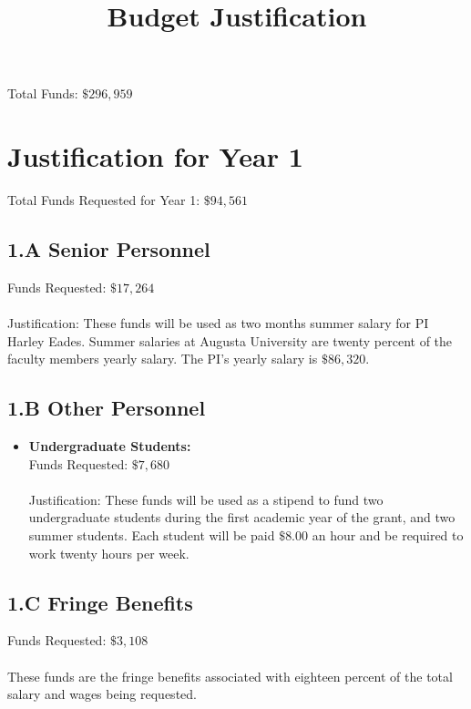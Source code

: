 \documentclass[11pt]{article}
\title{\vspace{-50px}Budget Justification}
\date{\vspace{-60px}}
\begin{document}
\maketitle  

\noindent
Total Funds: $\$296,959$\\
\vspace{-20px}
\section{Justification for Year 1}
\label{sec:year_1}
Total Funds Requested for Year 1: $\$94,561$\\
\vspace{-20px}
\subsection*{1.A Senior Personnel}
\label{subsec:a_senior_personnel}

Funds Requested: $\$17,264$\\
\ \\
Justification: These funds will be used as two months summer salary
for PI Harley Eades.  Summer salaries at Augusta University are twenty
percent of the faculty members yearly salary.  The PI's yearly salary
is $\$86,320$.


\subsection*{1.B Other Personnel}
\label{subsec:personnel}
\begin{itemize}

\item \textbf{Undergraduate Students:}\\ Funds Requested:
  $\$7,680$\\ \ \\ Justification: These funds will be used as a
  stipend to fund two undergraduate students during the first academic
  year of the grant, and two summer students.  Each student will be
  paid $\$8.00$ an hour and be required to work twenty hours per week.
\end{itemize}

\subsection*{1.C Fringe Benefits}
\label{subsec:c_fringe_benefits}
Funds Requested: $\$3,108$\\
\ \\
These funds are the fringe benefits associated with eighteen percent
of the total salary and wages being requested.  
\end{document}
